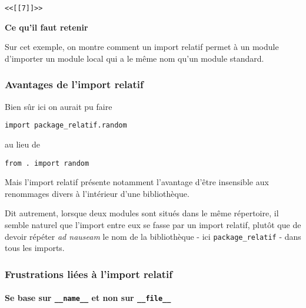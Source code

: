     \begin{Verbatim}[commandchars=\\\{\}]
<<[[7]]>>

    \end{Verbatim}

    \textbf{Ce qu'il faut retenir}

Sur cet exemple, on montre comment un import relatif permet à un module
d'importer un module local qui a le même nom qu'un module standard.

    \hypertarget{avantages-de-limport-relatif}{%
\subsubsection{Avantages de l'import
relatif}\label{avantages-de-limport-relatif}}

    Bien sûr ici on aurait pu faire

\begin{verbatim}
import package_relatif.random
\end{verbatim}

au lieu de

\begin{verbatim}
from . import random
\end{verbatim}

    Mais l'import relatif présente notamment l'avantage d'être insensible
aux renommages divers à l'intérieur d'une bibliothèque.

    Dit autrement, lorsque deux modules sont situés dans le même répertoire,
il semble naturel que l'import entre eux se fasse par un import relatif,
plutôt que de devoir répéter \emph{ad nauseam} le nom de la bibliothèque
- ici \texttt{package\_relatif} - dans tous les imports.

    \hypertarget{frustrations-liuxe9es-uxe0-limport-relatif}{%
\subsubsection{Frustrations liées à l'import
relatif}\label{frustrations-liuxe9es-uxe0-limport-relatif}}

    \hypertarget{se-base-sur-__name__-et-non-sur-__file__}{%
\paragraph{\texorpdfstring{Se base sur \texttt{\_\_name\_\_} et non sur
\texttt{\_\_file\_\_}}{Se base sur \_\_name\_\_ et non sur \_\_file\_\_}}\label{se-base-sur-__name__-et-non-sur-__file__}}

